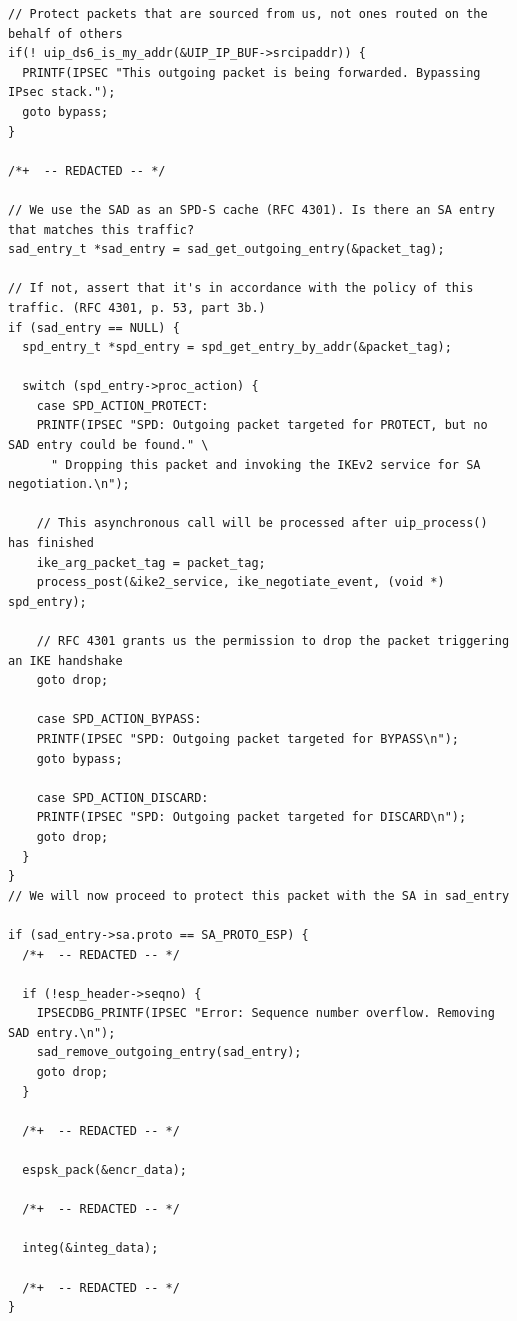 \documentclass[final,a4paper,twoside,11pt,onecolumn]{report}
\begin{document}
\begin{lstlisting}
// Protect packets that are sourced from us, not ones routed on the behalf of others
if(! uip_ds6_is_my_addr(&UIP_IP_BUF->srcipaddr)) {
  PRINTF(IPSEC "This outgoing packet is being forwarded. Bypassing IPsec stack.");
  goto bypass;
}

/*+  -- REDACTED -- */

// We use the SAD as an SPD-S cache (RFC 4301). Is there an SA entry that matches this traffic?
sad_entry_t *sad_entry = sad_get_outgoing_entry(&packet_tag);

// If not, assert that it's in accordance with the policy of this traffic. (RFC 4301, p. 53, part 3b.)
if (sad_entry == NULL) {
  spd_entry_t *spd_entry = spd_get_entry_by_addr(&packet_tag);

  switch (spd_entry->proc_action) {
    case SPD_ACTION_PROTECT:
    PRINTF(IPSEC "SPD: Outgoing packet targeted for PROTECT, but no SAD entry could be found." \
      " Dropping this packet and invoking the IKEv2 service for SA negotiation.\n");

    // This asynchronous call will be processed after uip_process() has finished
    ike_arg_packet_tag = packet_tag;
    process_post(&ike2_service, ike_negotiate_event, (void *) spd_entry);
        
    // RFC 4301 grants us the permission to drop the packet triggering an IKE handshake
    goto drop;
    
    case SPD_ACTION_BYPASS:
    PRINTF(IPSEC "SPD: Outgoing packet targeted for BYPASS\n");
    goto bypass;

    case SPD_ACTION_DISCARD:
    PRINTF(IPSEC "SPD: Outgoing packet targeted for DISCARD\n");
    goto drop;
  }
}
// We will now proceed to protect this packet with the SA in sad_entry

if (sad_entry->sa.proto == SA_PROTO_ESP) {
  /*+  -- REDACTED -- */

  if (!esp_header->seqno) {
    IPSECDBG_PRINTF(IPSEC "Error: Sequence number overflow. Removing SAD entry.\n");
    sad_remove_outgoing_entry(sad_entry);
    goto drop;
  }

  /*+  -- REDACTED -- */
  
  espsk_pack(&encr_data);
  
  /*+  -- REDACTED -- */
  
  integ(&integ_data);

  /*+  -- REDACTED -- */
}
\end{lstlisting}
\end{document}
